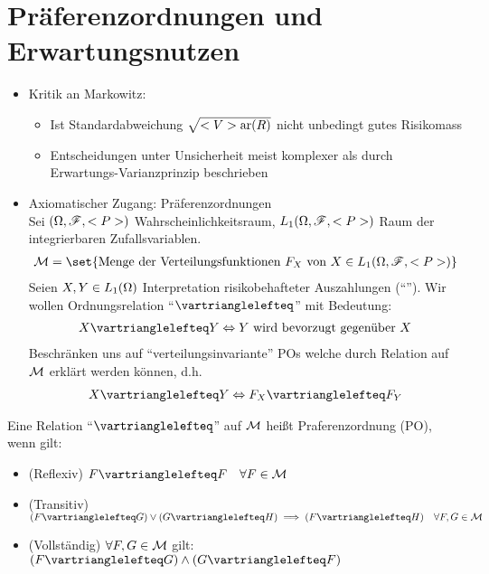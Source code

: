 \section{Präferenzordnungen und Erwartungsnutzen}
\begin{itemize}
	\item Kritik an Markowitz:
	\begin{itemize}
		\item Ist Standardabweichung $\sqrt{<V>\text{ar}(R)}$ nicht unbedingt gutes Risikomass
		\item Entscheidungen unter Unsicherheit meist komplexer als durch Erwartungs-Varianzprinzip beschrieben
	\end{itemize}
	\item Axiomatischer Zugang: Präferenzordnungen\\
	Sei $(\Omega,\mathscr F,<P>)$ Wahrscheinlichkeitsraum, $L_1(\Omega,\mathscr F,<P>)$ Raum der integrierbaren Zufallsvariablen.
	\begin{align*}
		\MM = \set{\text{Menge der Verteilungsfunktionen } F_X \text{ von } X \in L_1(\O,\F,\P)}
	\end{align*}
	Seien $X,Y \in L_1(\Omega)$ Interpretation risikobehafteter Auszahlungen (``''). Wir wollen Ordnungsrelation ``$\vartrianglelefteq$'' mit Bedeutung:
	\begin{align*}
		X \vartrianglelefteq Y \Leftrightarrow Y \text{ wird bevorzugt gegenüber }X
	\end{align*}
	Beschränken uns auf ``verteilungsinvariante'' POs welche durch Relation auf $\mathcal M$ erklärt werden können, d.h.
	\begin{align*}
		X \vartrianglelefteq Y \Leftrightarrow F_X \vartrianglelefteq F_Y
	\end{align*}
\end{itemize}
\begin{definition}
	Eine Relation ``$\vartrianglelefteq$'' auf $\mathcal M$ heißt Praferenzordnung (PO), wenn gilt:
	\begin{itemize}
		\item (Reflexiv) $F \vartrianglelefteq F\quad \forall F \in \MM$
		\item (Transitiv) $(F \vartrianglelefteq G)\vee (G \vartrianglelefteq H) \implies (F \vartrianglelefteq H)\quad \forall F,G \in \MM$
		\item (Vollständig) $\forall F,G \in \mathcal M$ gilt: $(F\vartrianglelefteq G)\wedge (G \vartrianglelefteq F)$
	\end{itemize}
\end{definition}
